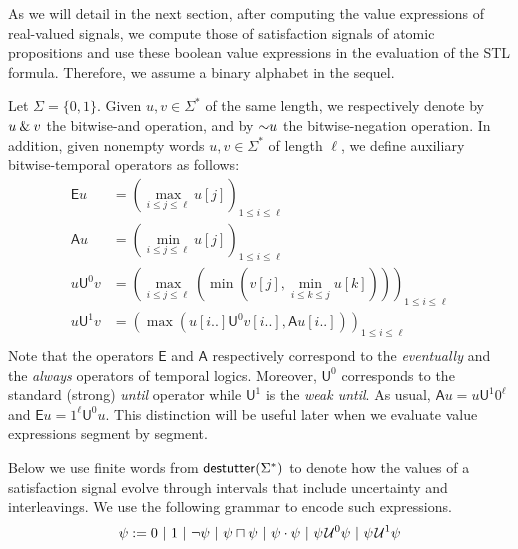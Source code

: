 As we will detail in the next section, after computing the value expressions of real-valued signals, we compute those of satisfaction signals of atomic propositions and use these boolean value expressions in the evaluation of the STL formula.
Therefore, we assume a binary alphabet in the sequel.

Let $\Sigma = \{0,1\}$.
Given $u,v \in \Sigma^*$ of the same length, we respectively denote by $u \mathbin{\&} v$ the bitwise-and operation, and by $\mathord{\sim} u$ the bitwise-negation operation.
In addition, given nonempty words $u,v \in \Sigma^*$ of length $\ell$, we define auxiliary bitwise-temporal operators as follows:
\begin{align*}
\mathsf{E} u &= \left( \max_{i \leq j \leq \ell} u[j] \right)_{1 \leq i \leq \ell} \\
\mathsf{A} u &= \left( \min_{i \leq j \leq \ell} u[j] \right)_{1 \leq i \leq \ell} \\
u \mathsf{U}^0 v &= \left( \max_{i \leq j \leq \ell} \left( \min \left( v[j], \min_{i \leq k \leq j} u[k] \right) \right) \right)_{1 \leq i \leq \ell} \\
u \mathsf{U}^1 v &= \left( \max \left( u[i..] \mathsf{U}^0 v[i..], \mathsf{A} u[i..] \right) \right)_{1 \leq i \leq \ell} \\
\end{align*}
Note that the operators $\mathsf{E}$ and $\mathsf{A}$ respectively correspond to the \emph{eventually} and the \emph{always} operators of temporal logics.
Moreover, $\mathsf{U}^0$ corresponds to the standard (strong) \emph{until} operator while $\mathsf{U}^1$ is the \emph{weak until}.
As usual, $\mathsf{A} u = u \mathsf{U}^1 0^\ell$ and $\mathsf{E} u = 1^\ell \mathsf{U}^0 u$.
This distinction will be useful later when we evaluate value expressions segment by segment.

Below we use finite words from $\mathsf{destutter}(\Sigma^*)$ to denote how the values of a satisfaction signal evolve through intervals that include uncertainty and interleavings.
We use the following grammar to encode such expressions.
$$ \psi := 0 ~|~ 1 ~|~ \lnot \psi  ~|~ \psi \sqcap \psi ~|~ \psi \cdot \psi ~|~ \psi \kern.1em\mathcal{U}^0 \psi ~|~ \psi \kern.1em\mathcal{U}^1 \psi $$ %

